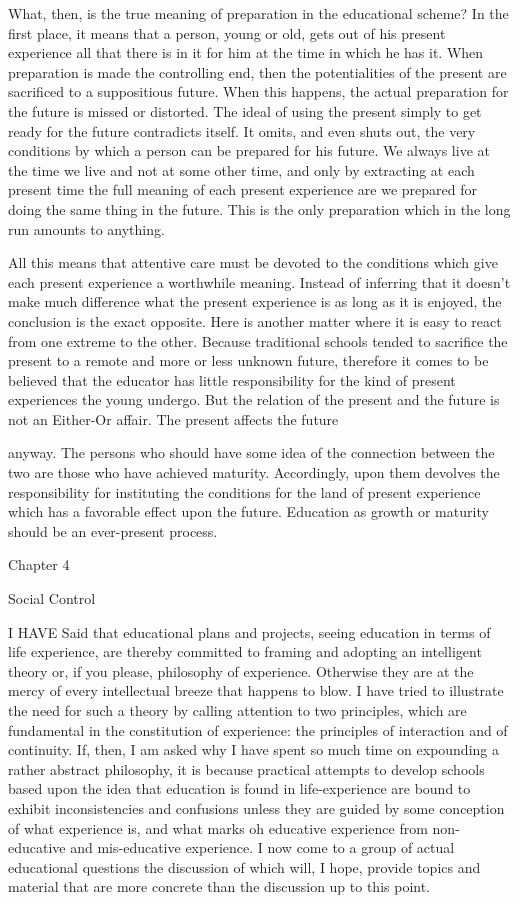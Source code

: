 What, then, is the true meaning of preparation in the educational scheme? In the first 
place, it means that a person, young or old, gets out of his present experience all that 
there is in it for him at the time in which he has it. When preparation is made the 
controlling end, then the potentialities of the present are sacrificed to a suppositious 
future. When this happens, the actual preparation for the future is missed or distorted. 
The ideal of using the present simply to get ready for the future contradicts itself. It 
omits, and even shuts out, the very conditions by which a person can be prepared for his 
future. We always live at the time we live and not at some other time, and only by 
extracting at each present time the full meaning of each present experience are we 
prepared for doing the same thing in the future. This is the only preparation which in the 
long run amounts to anything. 

All this means that attentive care must be devoted to the conditions which give each 
present experience a worthwhile meaning. Instead of inferring that it doesn't make much 
difference what the present experience is as long as it is enjoyed, the conclusion is the 
exact opposite. Here is another matter where it is easy to react from one extreme to the 
other. Because traditional schools tended to sacrifice the present to a remote and more or 
less unknown future, therefore it comes to be believed that the educator has little 
responsibility for the kind of present experiences the young undergo. But the relation of 
the present and the future is not an Either-Or affair. The present affects the future 



anyway. The persons who should have some idea of the connection between the two are 
those who have achieved maturity. Accordingly, upon them devolves the responsibility 
for instituting the conditions for the land of present experience which has a favorable 
effect upon the future. Education as growth or maturity should be an ever-present 
process. 


Chapter 4 


Social Control 


I HAVE Said that educational plans and projects, seeing education in terms of life 
experience, are thereby committed to framing and adopting an intelligent theory or, if you 
please, philosophy of experience. Otherwise they are at the mercy of every intellectual 
breeze that happens to blow. I have tried to illustrate the need for such a theory by calling 
attention to two principles, which are fundamental in the constitution of experience: the 
principles of interaction and of continuity. If, then, I am asked why I have spent so much 
time on expounding a rather abstract philosophy, it is because practical attempts to 
develop schools based upon the idea that education is found in life-experience are bound 
to exhibit inconsistencies and confusions unless they are guided by some conception of 
what experience is, and what marks oh educative experience from non-educative and 
mis-educative experience. I now come to a group of actual educational questions the 
discussion of which will, I hope, provide topics and material that are more concrete than 
the discussion up to this point. 

